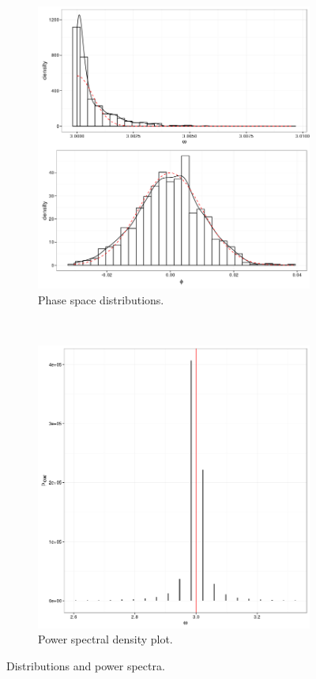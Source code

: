 \documentclass{article}
\begin{document}
\begin{figure}[h]
	\begin{subfigure}[b]{.45\textwidth}
		\centering
		\includegraphics[scale=.5]{img/Signal/PHYS_PS_dist}
		\caption{Phase space distributions.\label{fig:PSdist_cDy}}
	\end{subfigure}~~~~~~~~
	\begin{subfigure}[b]{.45\textwidth}
		\centering
		\includegraphics[scale=.5]{img/Signal/PHYS_Spectrum}
		\caption{Power spectral density plot.\label{fig:PSD_cDyPhys}}
	\end{subfigure}
	\caption{Distributions and power spectra.}
\end{figure}
\end{document}
